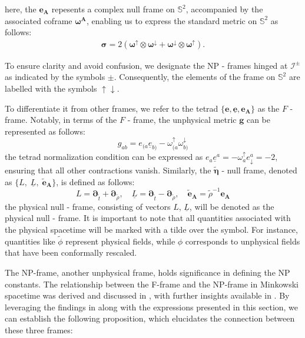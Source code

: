 here, the $\boldsymbol{e}_{\boldsymbol{A}}$ repesents a complex null frame on $\mathbb{S}^2$, accompanied by the associated coframe $\boldsymbol{\omega}^{\boldsymbol{A}}$, enabling us to express the standard metric on $\mathbb{S}^2$ as follows:
\begin{align}
\bm\sigma=2(\bm\omega^{\uparrow}\otimes \bm\omega^{\downarrow}+\bm\omega^{\downarrow}\otimes \bm\omega^{\uparrow}).
\end{align}
\begin{remark}
  To ensure clarity and avoid confusion, we designate the NP - frames hinged at $\mathscr{I}^{\pm}$ as indicated by the symbols $\pm$. Consequently, the elements of the frame on $\mathbb{S}^2$ are labelled with the symbols $\uparrow \downarrow$.
\end{remark}

To differentiate it from other frames, we refer to the tetrad $\{\boldsymbol{e}, \underline{\boldsymbol{e}}, \boldsymbol{e}_{\boldsymbol{A}}\}$ as the $F$ - frame. Notably, in terms of the $F$ - frame, the unphysical metric $\boldsymbol{g}$ can be represented as follows:
\begin{equation}\label{eq:UnphysicalMetricNullTetrad}
  g_{a b}=e_{(a} \underline{e}_{b)}-\omega_{(a}^{\uparrow} \omega_{b)}^{\downarrow}
\end{equation}
the tetrad normalization condition can be expressed as $e_a \underline{e}^a=-\omega^{\uparrow}_ae_{\downarrow}^a=-2$, ensuring that all other contractions vanish. Similarly, the $\tilde{\boldsymbol{\eta}}$ - null frame, denoted as $\{L, \; \underline{L},\; \tilde{\boldsymbol{e}}_{\boldsymbol{A}}\}$, is defined as follows:
\begin{equation}
  L=\boldsymbol{\partial}_{\tilde{t}}+\boldsymbol{\partial}_{\tilde{\rho}}, \quad \underline{L}=\boldsymbol{\partial}_{\tilde{t}}-\boldsymbol{\partial}_{\tilde{\rho}}, \quad \tilde{\boldsymbol{e}}_{\boldsymbol{A}}=\tilde{\rho}^{-1} \boldsymbol{e}_{\boldsymbol{A}}
\end{equation}
the physical null - frame, consisting of vectors $L$, $\underline{L}$, will be denoted as the physical null - frame. It is important to note that all quantities associated with the physical spacetime will be marked with a tilde over the symbol. For instance, quantities like $\tilde{\phi}$ represent physical fields, while $\phi$ corresponds to unphysical fields that have been conformally rescaled.

\medskip
The NP-frame, another unphysical frame, holds significance in defining the NP constants. The relationship between the F-frame and the NP-frame in Minkowski spacetime was derived and discussed in \cite{GasKro16d}, with further insights available in \cite{ValAli22}. By leveraging the findings in \cite{GasKro16d} along with the expressions presented in this section, we can establish the following proposition, which elucidates the connection between these three frames:
 

